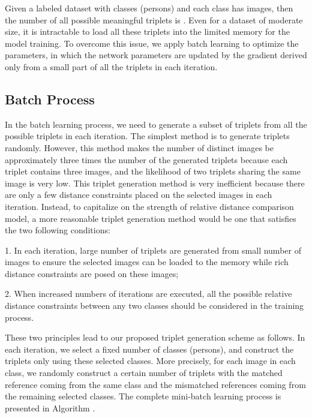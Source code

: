 \documentclass[letterpaper]{article}
\begin{document}
Given a labeled dataset with  classes (persons) and each class has  images, then the number of all possible meaningful triplets is . Even for a dataset of moderate size, it is intractable to load all these triplets into the limited memory for the model training. To overcome this issue, we apply batch learning to optimize the parameters, in which the network parameters are updated by the gradient derived only from a small part of all the triplets in each iteration.

\subsection{Batch Process}

In the batch learning process, we need to generate a subset of triplets from all the possible triplets in each iteration. The simplest method is to generate triplets randomly. However, this method makes the number of distinct images be approximately three times the number of the generated triplets because each triplet contains three images, and the likelihood of two triplets sharing the same image is very low. This triplet generation method is very inefficient because there are only a few distance constraints placed on the selected images in each iteration. Instead, to capitalize on the strength of relative distance comparison model, a more reasonable triplet generation method would be one that satisfies the two following conditions:

1. In each iteration, large number of triplets are generated from small number of images to ensure the selected images can be loaded to the memory while rich distance constraints are posed on these images;

2. When increased numbers of iterations are executed, all the possible relative distance constraints between any two classes should be considered in the training process.

These two principles lead to our  proposed triplet generation scheme as follows. In each iteration, we select a fixed number of classes (persons), and construct the triplets only using these selected classes.  More precisely, for each image in each class, we randomly construct a certain number of triplets with the matched reference coming from the same class and the mismatched references coming from the remaining selected classes. The complete mini-batch learning process is presented in Algorithm .
\end{document}
